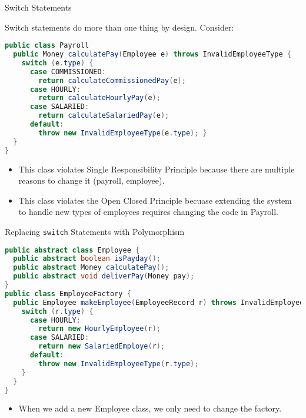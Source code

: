 \documentclass{beamer}
\begin{document}
\begin{frame}[fragile]{Switch Statements}


Switch statements do more than one thing by design.  Consider:
\begin{lstlisting}[language=Java]
public class Payroll
  public Money calculatePay(Employee e) throws InvalidEmployeeType {
    switch (e.type) {
      case COMMISSIONED:
        return calculateCommissionedPay(e);
      case HOURLY:
        return calculateHourlyPay(e);
      case SALARIED:
        return calculateSalariedPay(e);
      default:
        throw new InvalidEmployeeType(e.type); }
  }
}
\end{lstlisting}

\begin{itemize}
\item This class violates Single Responsibility Principle because there are multiple reasons to change it (payroll, employee).
\item This class violates the Open Closed Principle becuase extending the system to handle new types of employees requires changing the code in Payroll.
\end{itemize}


\end{frame}

\begin{frame}[fragile]{Replacing {\tt switch} Statements with Polymorphism}


\begin{lstlisting}[language=Java]
public abstract class Employee {
  public abstract boolean isPayday();
  public abstract Money calculatePay();
  public abstract void deliverPay(Money pay);
}
public class EmployeeFactory {
  public Employee makeEmployee(EmployeeRecord r) throws InvalidEmployeeType { 
    switch (r.type) {
      case HOURLY:
        return new HourlyEmployee(r);
      case SALARIED:
        return new SalariedEmploye(r);
      default:
        throw new InvalidEmployeeType(r.type);
    }
  }
}
\end{lstlisting}

\begin{itemize}
\item When we add a new Employee class, we only need to change the factory.
\end{itemize}


\end{frame}
\end{document}
